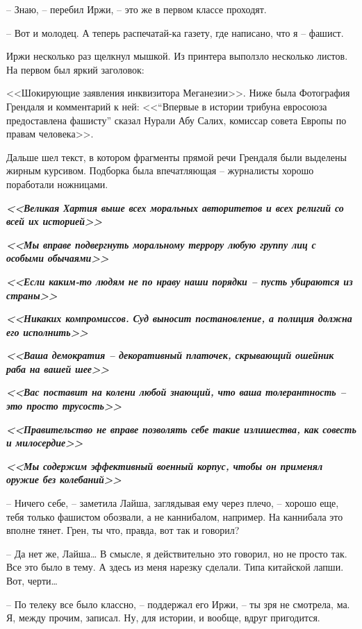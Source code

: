 -- Знаю, -- перебил Иржи, -- это же в первом классе проходят.

-- Вот и молодец. А теперь распечатай-ка газету, где написано, что я -- фашист.

Иржи несколько раз щелкнул мышкой. Из принтера выползло несколько листов. На первом был яркий заголовок:

<<Шокирующие заявления инквизитора Меганезии>>. Ниже была Фотография Грендаля и комментарий к ней: <<``Впервые в истории трибуна евросоюза предоставлена фашисту'' сказал Нурали Абу Салих, комиссар совета Европы по правам человека>>.

Дальше шел текст, в котором фрагменты прямой речи Грендаля были выделены жирным курсивом. Подборка была впечатляющая -- журналисты хорошо поработали ножницами.

\textit{\textbf{<<Великая Хартия выше всех моральных авторитетов и всех религий со всей их историей>>}}

\textit{\textbf{<<Мы вправе подвергнуть моральному террору любую группу лиц с особыми обычаями>>}}

\textit{\textbf{<<Если каким-то людям не по нраву наши порядки -- пусть убираются из страны>>}}

\textit{\textbf{<<Никаких компромиссов. Суд выносит постановление, а полиция должна его исполнить>>}}

\textit{\textbf{<<Ваша демократия -- декоративный платочек, скрывающий ошейник раба на вашей шее>>}}

\textit{\textbf{<<Вас поставит на колени любой знающий, что ваша толерантность -- это просто трусость>>}}

\textit{\textbf{<<Правительство не вправе позволять себе такие излишества, как совесть и милосердие>>}}

\textit{\textbf{<<Мы содержим эффективный военный корпус, чтобы он применял оружие без колебаний>>}}

-- Ничего себе, -- заметила Лайша, заглядывая ему через плечо, -- хорошо еще, тебя только фашистом обозвали, а не каннибалом, например. На каннибала это вполне тянет. Грен, ты что, правда, вот так и говорил?

-- Да нет же, Лайша\ldots{} В смысле, я действительно это говорил, но не просто так. Все это было в тему. А здесь из меня нарезку сделали. Типа китайской лапши. Вот, черти\ldots{}

-- По телеку все было классно, -- поддержал его Иржи, -- ты зря не смотрела, ма. Я, между прочим, записал. Ну, для истории, и вообще, вдруг пригодится.


